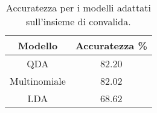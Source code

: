 \begin{table}[H]
\centering
\caption{Accuratezza per i modelli adattati sull'insieme di convalida.}
\begin{tabular}{cc}
\toprule
      Modello &  Accuratezza \% \\
\midrule
          QDA &          82.20 \\
 Multinomiale &          82.02 \\
          LDA &          68.62 \\
\bottomrule
\end{tabular}
\label{tab:acc}
\end{table}